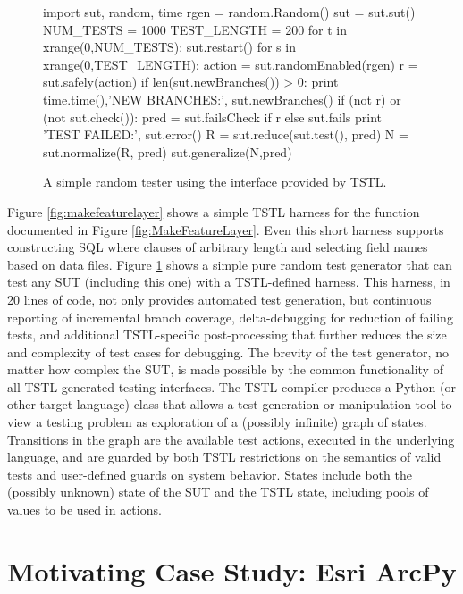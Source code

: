 \begin{figure}
{\scriptsize
\begin{code}
import sut, random, time
rgen = random.Random()
sut = sut.sut()
NUM\_TESTS = 1000
TEST\_LENGTH = 200 
for t in xrange(0,NUM\_TESTS):
   sut.restart()
   for s in xrange(0,TEST\_LENGTH): 
       action = sut.randomEnabled(rgen)
       r = sut.safely(action)
       if len(sut.newBranches()) > 0:
          print time.time(),'NEW BRANCHES:', sut.newBranches()
       if (not r) or (not sut.check()):
          pred = sut.failsCheck if r else sut.fails
          print 'TEST FAILED:', sut.error() 
          R = sut.reduce(sut.test(), pred)
          N = sut.normalize(R, pred) 
          sut.generalize(N,pred)
\end{code}
}
\caption{A simple random tester using the interface provided by TSTL.}
\label{fig:rt}
\end{figure}

Figure \ref{fig:makefeaturelayer} shows a simple TSTL harness for the
function documented in Figure \ref{fig:MakeFeatureLayer}.  Even this
short harness supports constructing SQL where clauses of arbitrary
length and selecting field names based on data files.  Figure
\ref{fig:rt} shows a simple pure random test generator that can test
any SUT (including this one) with a TSTL-defined harness.  This
harness, in 20 lines of code, not only provides automated test
generation, but continuous reporting of incremental branch coverage,
delta-debugging \cite{DD} for reduction of failing tests, and
additional TSTL-specific post-processing that further reduces the size
and complexity of test cases for debugging.  The brevity of the test
generator, no matter how complex the SUT, is made possible by the
common functionality of all TSTL-generated testing interfaces.  The
TSTL compiler produces a Python (or other target language) class that allows a test generation or manipulation
tool to view a testing problem as exploration of a (possibly infinite)
graph of states.  Transitions in the graph are the available test actions, executed in the underlying language, and are guarded by both TSTL
restrictions on the semantics of valid tests and user-defined guards
on system behavior.  States include both the (possibly unknown) state
of the SUT and the TSTL state, including pools of values to be used in actions.




\section{Motivating Case Study: Esri ArcPy}
\label{sec:arcpy}

